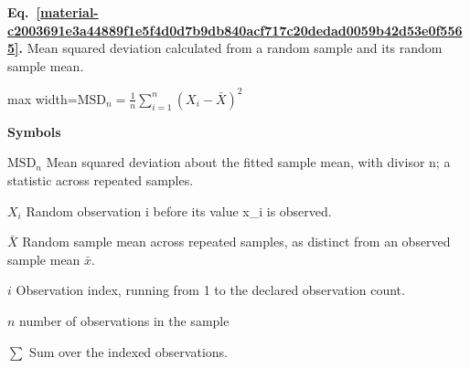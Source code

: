 \documentclass[11pt,a4paper]{article}
\begin{document}
\par\medskip
\begin{samepage}
\label{material-c2003691e3a44889f1e5f4d0d7b9db840acf717c20dedad0059b42d53e0f5565}
\noindent\textbf{Eq.~\ref*{material-c2003691e3a44889f1e5f4d0d7b9db840acf717c20dedad0059b42d53e0f5565}.} Mean squared deviation calculated from a random sample and its random sample mean.\par\nopagebreak
\begin{center}\begin{adjustbox}{max width=\linewidth}$\displaystyle \mathrm{MSD}_n=\frac1n{\textstyle\sum_{i=1}^n}(X_i-\bar X)^2$\end{adjustbox}\end{center}

\par\noindent\textbf{Symbols}

\par\noindent\textbf{\(\mathrm{MSD}_n\)} Mean squared deviation about the fitted sample mean, with divisor n; a statistic across repeated samples.

\par\noindent\textbf{\(X_i\)} Random observation i before its value x\_i is observed.

\par\noindent\textbf{\(\bar X\)} Random sample mean across repeated samples, as distinct from an observed sample mean \ensuremath{\bar{x}}.

\par\noindent\textbf{\(i\)} Observation index, running from 1 to the declared observation count.

\par\noindent\textbf{\(n\)} number of observations in the sample

\par\noindent\textbf{\(\sum\)} Sum over the indexed observations.

\end{samepage}
\medskip
\end{document}
